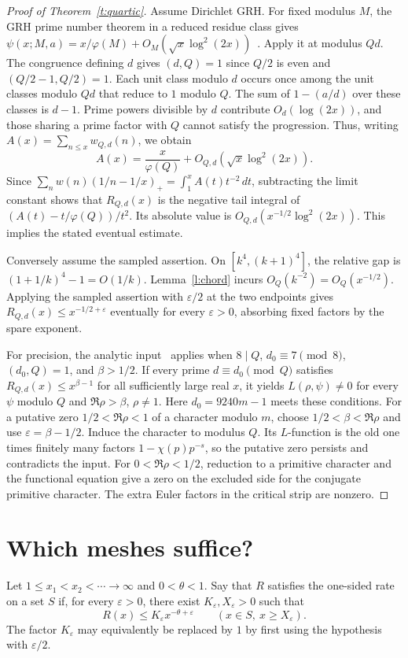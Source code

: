 \documentclass[11pt]{article}
\newcommand{\eps}{\varepsilon}
\begin{document}
\begin{proof}[Proof of Theorem~\ref{t:quartic}]
Assume Dirichlet GRH. For fixed modulus $M$, the GRH prime number theorem in a reduced residue class gives
$\psi(x;M,a)=x/\varphi(M)+O_M(\sqrt{x}\log^2(2x))$~\cite{ehp}. Apply it at modulus $Qd$. The congruence defining $d$ gives $(d,Q)=1$ since $Q/2$ is even and $(Q/2-1,Q/2)=1$. Each unit class modulo $d$ occurs once among the unit classes modulo $Qd$ that reduce to $1$ modulo $Q$. The sum of $1-(a/d)$ over these classes is $d-1$. Prime powers divisible by $d$ contribute $O_d(\log(2x))$, and those sharing a prime factor with $Q$ cannot satisfy the progression. Thus, writing $A(x)=\sum_{n\le x}w_{Q,d}(n)$, we obtain
\[
 A(x)=\frac{x}{\varphi(Q)}+O_{Q,d}(\sqrt{x}\log^2(2x)).
\]
Since $\sum_n w(n)(1/n-1/x)_+=\int_1^x A(t)t^{-2}\,dt$, subtracting the limit constant shows that $R_{Q,d}(x)$ is the negative tail integral of $(A(t)-t/\varphi(Q))/t^2$. Its absolute value is $O_{Q,d}(x^{-1/2}\log^2(2x))$. This implies the stated eventual estimate.

Conversely assume the sampled assertion. On $[k^4,(k+1)^4]$, the relative gap is $(1+1/k)^4-1=O(1/k)$. Lemma~\ref{l:chord} incurs $O_Q(k^{-2})=O_Q(x^{-1/2})$. Applying the sampled assertion with $\eps/2$ at the two endpoints gives $R_{Q,d}(x)\le x^{-1/2+\eps}$ eventually for every $\eps>0$, absorbing fixed factors by the spare exponent.

For precision, the analytic input~\cite{grh} applies when $8\mid Q$, $d_0\equiv7\pmod 8$, $(d_0,Q)=1$, and $\beta>1/2$. If every prime $d\equiv d_0\pmod Q$ satisfies $R_{Q,d}(x)\le x^{\beta-1}$ for all sufficiently large real $x$, it yields $L(\rho,\psi)\ne0$ for every $\psi$ modulo $Q$ and $\Re\rho>\beta$, $\rho\ne1$. Here $d_0=9240m-1$ meets these conditions. For a putative zero $1/2<\Re\rho<1$ of a character modulo $m$, choose $1/2<\beta<\Re\rho$ and use $\eps=\beta-1/2$. Induce the character to modulus $Q$. Its $L$-function is the old one times finitely many factors $1-\chi(p)p^{-s}$, so the putative zero persists and contradicts the input. For $0<\Re\rho<1/2$, reduction to a primitive character and the functional equation give a zero on the excluded side for the conjugate primitive character. The extra Euler factors in the critical strip are nonzero.
\end{proof}

\section{Which meshes suffice?}
Let $1\le x_1<x_2<\cdots\to\infty$ and $0<\theta<1$. Say that $R$ satisfies the one-sided rate on a set $S$ if, for every $\eps>0$, there exist $K_\eps,X_\eps>0$ such that
\[
 R(x)\le K_\eps x^{-\theta+\eps}\qquad(x\in S,\ x\ge X_\eps).
\]
The factor $K_\eps$ may equivalently be replaced by $1$ by first using the hypothesis with $\eps/2$.
\end{document}
